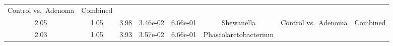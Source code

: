 \documentclass[12pt,]{article}
\begin{document}
\begin{longtable}[]{@{}cccccccc@{}}
\begin{minipage}[t]{0.14\columnwidth}
Control vs.~Adenoma\strut
\end{minipage} & \begin{minipage}[t]{0.09\columnwidth}\centering\strut
Combined\strut
\end{minipage}\tabularnewline
\begin{minipage}[t]{0.05\columnwidth}\centering\strut
2.05\strut
\end{minipage} & \begin{minipage}[t]{0.09\columnwidth}\centering\strut
1.05\strut
\end{minipage} & \begin{minipage}[t]{0.09\columnwidth}\centering\strut
3.98\strut
\end{minipage} & \begin{minipage}[t]{0.07\columnwidth}\centering\strut
3.46e-02\strut
\end{minipage} & \begin{minipage}[t]{0.07\columnwidth}\centering\strut
6.66e-01\strut
\end{minipage} & \begin{minipage}[t]{0.20\columnwidth}\centering\strut
Shewanella\strut
\end{minipage} & \begin{minipage}[t]{0.14\columnwidth}\centering\strut
Control vs.~Adenoma\strut
\end{minipage} & \begin{minipage}[t]{0.09\columnwidth}\centering\strut
Combined\strut
\end{minipage}\tabularnewline
\begin{minipage}[t]{0.05\columnwidth}\centering\strut
2.03\strut
\end{minipage} & \begin{minipage}[t]{0.09\columnwidth}\centering\strut
1.05\strut
\end{minipage} & \begin{minipage}[t]{0.09\columnwidth}\centering\strut
3.93\strut
\end{minipage} & \begin{minipage}[t]{0.07\columnwidth}\centering\strut
3.57e-02\strut
\end{minipage} & \begin{minipage}[t]{0.07\columnwidth}\centering\strut
6.66e-01\strut
\end{minipage} & \begin{minipage}[t]{0.20\columnwidth}\centering\strut
Phascolarctobacterium\strut
\end{minipage} & \begin{minipage}[t]{0.14\columnwidth}\centering\strut

\end{minipage}
\end{longtable}
\end{document}
